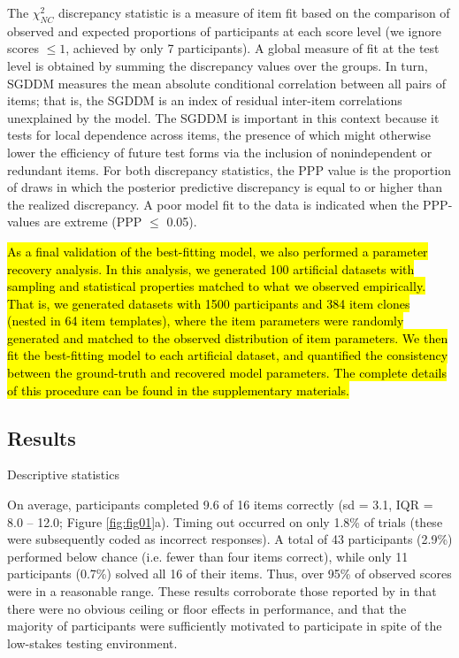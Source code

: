 \documentclass[a4paper,man,natbib,noextraspace]{apa6}
\makeatletter
\renewcommand{\subsubsection}{\@startsection{subsubsection}{3}
  {\z@}%
  {\b@level@two@skip}{\e@level@two@skip}%
  {\normalfont\normalsize\bfseries}}
\makeatother
\begin{document}
The $\chi^2_{NC}$ discrepancy statistic is a measure of item fit based on the comparison of observed and expected proportions of participants at each score level (we ignore scores $\leq 1$, achieved by only 7 participants). A global measure of fit at the test level is obtained by summing the discrepancy values over the groups. In turn, SGDDM measures the mean absolute conditional correlation between all pairs of items; that is, the SGDDM is an index of residual inter-item correlations unexplained by the model. The SGDDM is important in this context because it tests for local dependence across items, the presence of which might otherwise lower the efficiency of future test forms via the inclusion of nonindependent or redundant items. For both discrepancy statistics, the PPP value is the proportion of draws in which the posterior predictive discrepancy is equal to or higher than the realized discrepancy. A poor model fit to the data is indicated when the PPP-values are extreme (PPP $\leq$ 0.05).

\hl{As a final validation of the best-fitting model, we also performed a parameter recovery analysis. In this analysis, we generated 100 artificial datasets with sampling and statistical properties matched to what we observed empirically. That is, we generated datasets with 1500 participants and 384 item clones (nested in 64 item templates), where the item parameters were randomly generated and matched to the observed distribution of item parameters. We then fit the best-fitting model to each artificial dataset, and quantified the consistency between the ground-truth and recovered model parameters. The complete details of this procedure can be found in the supplementary materials.}

\subsection{Results}

\subsubsection{Descriptive statistics}

On average, participants completed 9.6 of 16 items correctly (sd = 3.1, IQR = 8.0 -- 12.0; Figure \ref{fig:fig01}a). Timing out occurred on only 1.8\% of trials (these were subsequently coded as incorrect responses). A total of 43 participants (2.9\%) performed below chance (i.e. fewer than four items correct), while only 11 participants (0.7\%) solved all 16 of their items. Thus, over 95\% of observed scores were in a reasonable range. These results corroborate those reported by \cite{chierchia2019matrix} in that there were no obvious ceiling or floor effects in performance, and that the majority of participants were sufficiently motivated to participate in spite of the low-stakes testing environment.  
\end{document}
